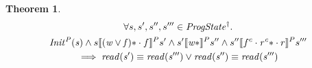 \documentclass[letterpaper,twocolumn,10pt]{article}
\newtheorem{theorem}{Theorem}[section]
\theoremstyle{definition}
\begin{document}
\begin{theorem}
\begin{multline*}
      \forall s, s', s'', s''' \in \mathit{ProgState^\dagger} \ldotp\\\mathit{Init^P(s)} \land s \llbracket \mathit{(w \lor f)\ast} \cdot f \rrbracket^P s' \land
      s' \llbracket \mathit{w\ast} \rrbracket^P s'' \land
      s'' \llbracket f^c \cdot \mathit{r^c\ast} \cdot r \rrbracket^P s'''\\
      \implies \mathit{read(s')} \equiv \mathit{read(s''')} \lor \mathit{read(s'')} \equiv \mathit{read(s''')}
\end{multline*}
\end{theorem}
\end{document}

